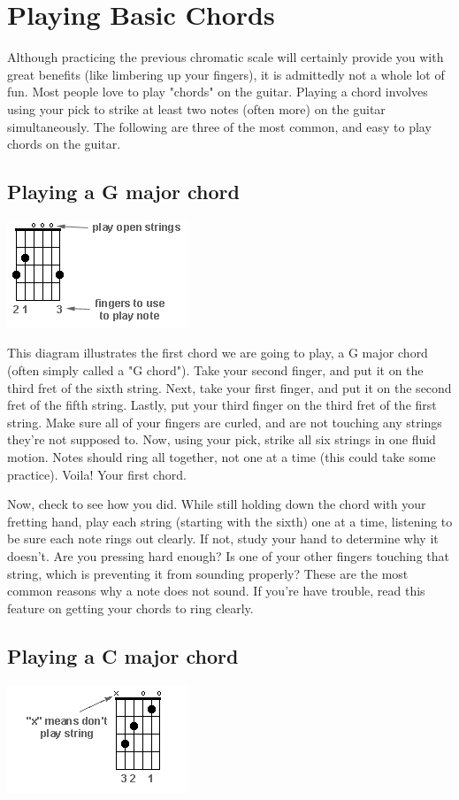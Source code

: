 \section{Playing Basic Chords}
Although practicing the previous chromatic scale will certainly provide you
with great benefits (like limbering up your fingers), it is admittedly not a
whole lot of fun. Most people love to play "chords" on the guitar. Playing a
chord involves using your pick to strike at least two notes (often more) on the
guitar simultaneously. The following are three of the most common, and easy to
play chords on the guitar. 

\subsection{Playing a G major chord}
\includegraphics{partone/opengmajor.png}

This diagram illustrates the first chord we are going to play, a G major chord
(often simply called a "G chord"). Take your second finger, and put it on the
third fret of the sixth string. Next, take your first finger, and put it on the
second fret of the fifth string. Lastly, put your third finger on the third
fret of the first string. Make sure all of your fingers are curled, and are not
touching any strings they're not supposed to. Now, using your pick, strike all
six strings in one fluid motion. Notes should ring all together, not one at a
time (this could take some practice). Voila! Your first chord.

Now, check to see how you did. While still holding down the chord with your
fretting hand, play each string (starting with the sixth) one at a time,
listening to be sure each note rings out clearly. If not, study your hand to
determine why it doesn't. Are you pressing hard enough? Is one of your other
fingers touching that string, which is preventing it from sounding properly?
These are the most common reasons why a note does not sound. If you're have
trouble, read this feature on getting your chords to ring clearly. 

\subsection{Playing a C major chord}
\includegraphics{partone/opencmajor.png}

